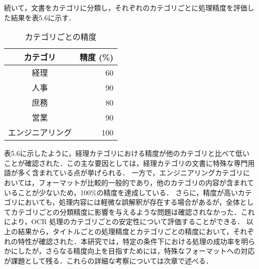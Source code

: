続いて，文書をカテゴリに分類し，それぞれのカテゴリごとに処理精度を評価した結果を表5.6に示す．

\begin{table}[h]
  \begin{center}
  \begin{tabular}{|c|r|}
    \hline
    \textbf{カテゴリ} & \textbf{精度 (\%)} \\ \hline
    経理 & 60 \\ \hline
    人事 & 90 \\ \hline
    庶務 & 80 \\ \hline
    営業 & 90 \\ \hline
    エンジニアリング & 100 \\ \hline
  \end{tabular}
  \end{center}
  \caption{カテゴリごとの精度}
  \label{tab:category_accuracy}
\end{table}

表5.6に示したように，経理カテゴリにおける精度が他のカテゴリと比べて低いことが確認された．この主な要因としては，経理カテゴリの文書に特殊な専門用語が多く含まれている点が挙げられる．
一方で，エンジニアリングカテゴリにおいては，フォーマットが比較的一般的であり，他のカテゴリの内容が含まれていることが少ないため，100\%の精度を達成している．
さらに，精度が高いカテゴリにおいても，処理内容には軽微な誤解釈が存在する場合があるが，全体としてカテゴリごとの分類精度に影響を与えるような問題は確認されなかった．これにより，OCR 処理のカテゴリごとの安定性について評価することができる．
以上の結果から，タイトルごとの処理精度とカテゴリごとの精度において，それぞれの特性が確認された．本研究では，特定の条件下における処理の成功率を明らかにしたが，さらなる精度向上を目指すためには，特殊なフォーマットへの対応が課題として残る．これらの詳細な考察については次章で述べる．
